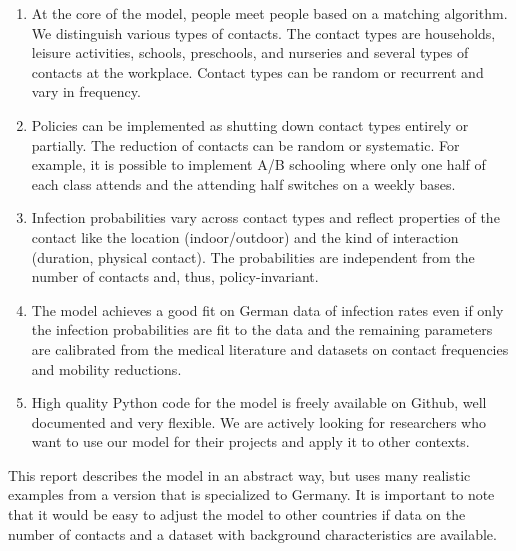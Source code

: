 \begin{enumerate}
    \item At the core of the model, people meet people based on a matching algorithm. We
          distinguish various types of contacts. The contact types are households,
          leisure activities, schools, preschools, and nurseries and several types of
          contacts at the workplace. Contact types can be random or recurrent and vary
          in frequency.

    \item Policies can be implemented as shutting down contact types entirely or
          partially. The reduction of contacts can be random or systematic. For example,
          it is possible to implement A/B schooling where only one half of each class
          attends and the attending half switches on a weekly bases.

    \item Infection probabilities vary across contact types and reflect properties of
          the contact like the location (indoor/outdoor) and the kind of interaction
          (duration, physical contact). The probabilities are independent from the
          number of contacts and, thus, policy-invariant.

    \item The model achieves a good fit on German data of infection rates even if only
          the infection probabilities are fit to the data and the remaining parameters
          are calibrated from the medical literature and datasets on contact
          frequencies and mobility reductions.

    \item High quality Python code for the model is freely available on Github, well
          documented and very flexible\footnotemark. We are actively looking for
          researchers who want to use our model for their projects and apply it to other
          contexts.
\end{enumerate}


This report describes the model in an abstract way, but uses many realistic examples
from a version that is specialized to Germany. It is important to note that it would
be easy to adjust the model to other countries if data on the number of contacts and
a dataset with background characteristics are available.

